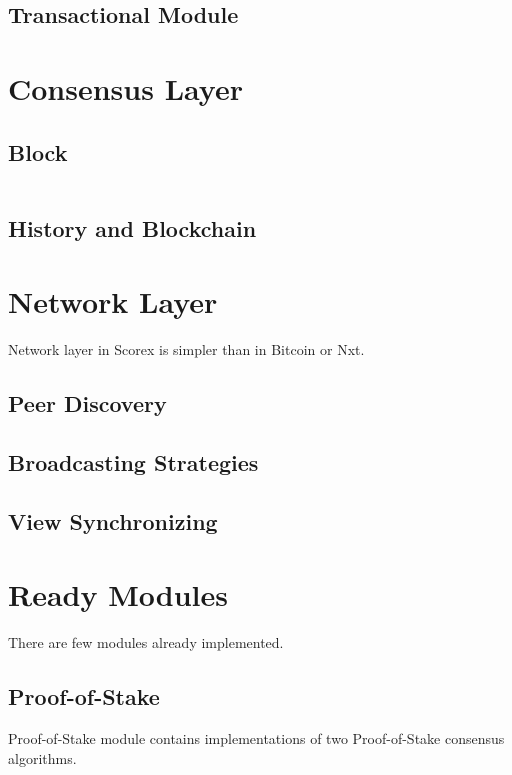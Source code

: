 \documentclass[]{report}   %
\begin{document}
\subsection{Transactional Module}



\section{Consensus Layer}

\subsection{Block}

\begin{lstlisting}

\end{lstlisting}

\subsection{History and Blockchain}

\section{Network Layer}

Network layer in Scorex is simpler than in Bitcoin or Nxt. 

\subsection{Peer Discovery}

\subsection{Broadcasting Strategies}

\subsection{View Synchronizing}

\section{Ready Modules}
There are few modules already implemented.

\subsection{Proof-of-Stake}
Proof-of-Stake module contains implementations of two Proof-of-Stake consensus algorithms. 
\end{document}
